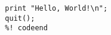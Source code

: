 \documentclass{article}
\begin{document}
\begin{lstlisting}[frame=single]
  %! codefile: helloworld.bc
  print "Hello, World!\n";
  quit();
  %! codeend
\end{lstlisting}
\end{document}
